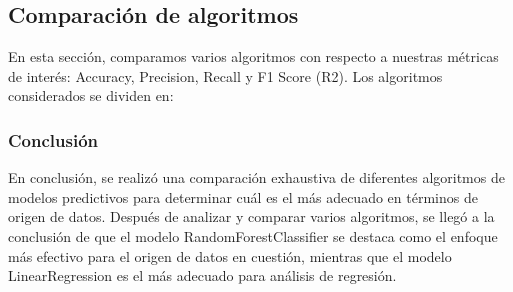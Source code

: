 \subsection{Comparación de algoritmos}
\label{subsec:comparaAlgoritmos}

En esta sección, comparamos varios algoritmos con respecto a nuestras métricas de interés: Accuracy, Precision, Recall y F1 Score (R2). Los algoritmos considerados se dividen en:








\subsubsection{Conclusión}

En conclusión, se realizó una comparación exhaustiva de diferentes algoritmos de modelos predictivos para determinar cuál es el más adecuado en términos de origen de datos. Después de analizar y comparar varios algoritmos, se llegó a la conclusión de que el modelo RandomForestClassifier se destaca como el enfoque más efectivo para el origen de datos en cuestión, mientras que el modelo LinearRegression es el más adecuado para análisis de regresión.